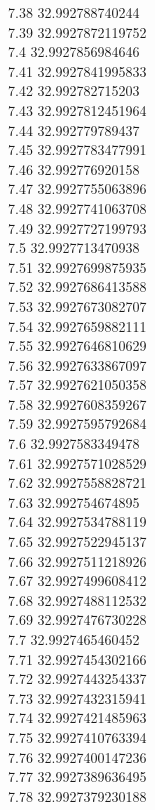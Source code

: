 {7.38	32.992788740244\\
7.39	32.9927872119752\\
7.4	32.9927856984646\\
7.41	32.9927841995833\\
7.42	32.992782715203\\
7.43	32.9927812451964\\
7.44	32.992779789437\\
7.45	32.9927783477991\\
7.46	32.992776920158\\
7.47	32.9927755063896\\
7.48	32.9927741063708\\
7.49	32.9927727199793\\
7.5	32.9927713470938\\
7.51	32.9927699875935\\
7.52	32.9927686413588\\
7.53	32.9927673082707\\
7.54	32.9927659882111\\
7.55	32.9927646810629\\
7.56	32.9927633867097\\
7.57	32.9927621050358\\
7.58	32.9927608359267\\
7.59	32.9927595792684\\
7.6	32.9927583349478\\
7.61	32.9927571028529\\
7.62	32.9927558828721\\
7.63	32.992754674895\\
7.64	32.9927534788119\\
7.65	32.9927522945137\\
7.66	32.9927511218926\\
7.67	32.9927499608412\\
7.68	32.9927488112532\\
7.69	32.9927476730228\\
7.7	32.9927465460452\\
7.71	32.9927454302166\\
7.72	32.9927443254337\\
7.73	32.9927432315941\\
7.74	32.9927421485963\\
7.75	32.9927410763394\\
7.76	32.9927400147236\\
7.77	32.9927389636495\\
7.78	32.9927379230188\\
}
